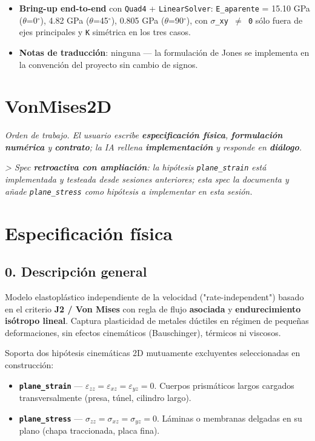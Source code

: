\documentclass[11pt,letterpaper,oneside]{report}
\begin{document}
\begin{itemize}
  \item \textbf{Bring-up end-to-end} con \texttt{Quad4} + \texttt{LinearSolver}: \texttt{E\_aparente} = 15.10 GPa (\ensuremath{\theta}=0\ensuremath{^{\circ}}), 4.82 GPa (\ensuremath{\theta}=45\ensuremath{^{\circ}}), 0.805 GPa (\ensuremath{\theta}=90\ensuremath{^{\circ}}), con \texttt{\ensuremath{\sigma}\_xy \ensuremath{\neq} 0} sólo fuera de ejes principales y \texttt{K} simétrica en los tres casos.
  \item \textbf{Notas de traducción}: ninguna --- la formulación de Jones se implementa en la convención del proyecto sin cambio de signos.
\end{itemize}


\newpage

\section{VonMises2D}



\textit{Orden de trabajo. El usuario escribe \textbf{especificación física}, \textbf{formulación numérica} y \textbf{contrato}; la IA rellena \textbf{implementación} y responde en \textbf{diálogo}.}

\textit{> Spec \textbf{retroactiva con ampliación}: la hipótesis \texttt{plane\_strain} está implementada y testeada desde sesiones anteriores; esta spec la documenta y añade \texttt{plane\_stress} como hipótesis a implementar en esta sesión.}



\section{Especificación física}

\subsection{0. Descripción general}

Modelo elastoplástico independiente de la velocidad ("rate-independent") basado en el criterio \textbf{J2 / Von Mises} con regla de flujo \textbf{asociada} y \textbf{endurecimiento isótropo lineal}. Captura plasticidad de metales dúctiles en régimen de pequeñas deformaciones, sin efectos cinemáticos (Bauschinger), térmicos ni viscosos.

Soporta dos hipótesis cinemáticas 2D mutuamente excluyentes seleccionadas en construcción:

\begin{itemize}
  \item \textbf{\texttt{plane\_strain}} --- $\varepsilon_{zz} = \varepsilon_{xz} = \varepsilon_{yz} = 0$. Cuerpos prismáticos largos cargados transversalmente (presa, túnel, cilindro largo).
  \item \textbf{\texttt{plane\_stress}} --- $\sigma_{zz} = \sigma_{xz} = \sigma_{yz} = 0$. Láminas o membranas delgadas en su plano (chapa traccionada, placa fina).
\end{itemize}
\end{document}
